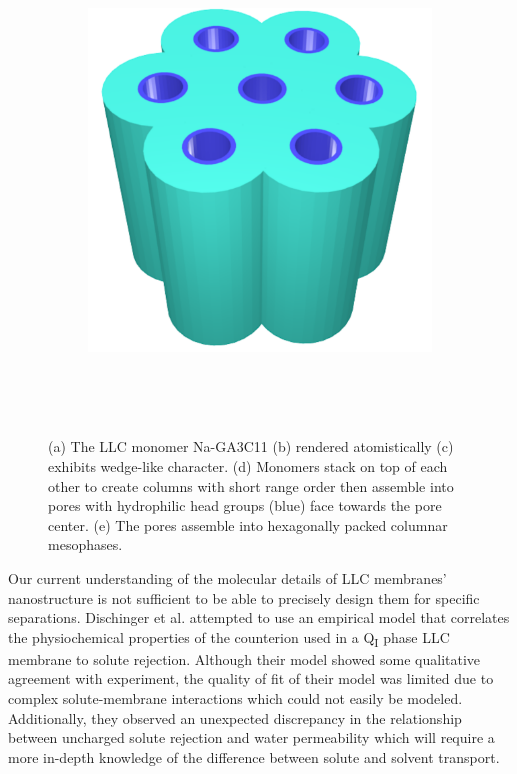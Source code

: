 \documentclass[journal=jpcbfk,manuscript=article]{achemso}
\begin{document}
\begin{figure}
\begin{subfigure}{0.4\linewidth}
		\caption{}~\label{fig:wedge_layer}
	\end{subfigure}
	\begin{subfigure}{0.4\linewidth}
		\centering
		\includegraphics[width=\textwidth]{hexagonal_packing.pdf}
		\caption{}~\label{fig:hex_packing_simple}
	\end{subfigure}
	\caption{(a) The LLC monomer Na-GA3C11 (b) rendered atomistically (c)
	exhibits wedge-like character. (d) Monomers stack on top of each other to
	create columns with short range order then assemble into pores with  
	hydrophilic head groups (blue) face towards the pore center. (e) The 
	pores assemble into hexagonally packed columnar mesophases.}~\label{fig:assembly}
  \end{figure}


  Our current understanding of the molecular details of LLC membranes'
  nanostructure is not sufficient to be able to precisely design them for
  specific separations. Dischinger et al. attempted to use an empirical model
  that correlates the physiochemical properties of the counterion used in a 
  Q\textsubscript{I} phase LLC membrane to solute rejection\cite{dischinger_effect_2017}.
  Although their model showed some qualitative agreement with experiment, the
  quality of fit of their model was limited due to complex solute-membrane 
  interactions which could not easily be modeled. Additionally, they observed
  an unexpected discrepancy in the relationship between uncharged solute
  rejection and water permeability which will require a more in-depth knowledge of
  the difference between solute and solvent transport.
  
\end{document}
